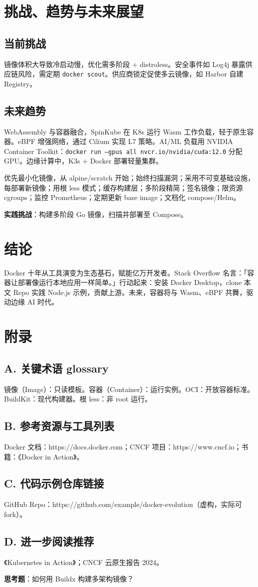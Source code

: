 \chapter{挑战、趋势与未来展望}
\section{当前挑战}
镜像体积大导致冷启动慢，优化需多阶段 + distroless。安全事件如 Log4j 暴露供应链风险，需定期 \texttt{docker scout}。供应商锁定促使多云镜像，如 Harbor 自建 Registry。\par
\section{未来趋势}
WebAssembly 与容器融合，SpinKube 在 K8s 运行 Wasm 工作负载，轻于原生容器。eBPF 增强网络，通过 Cilium 实现 L7 策略。AI/ML 负载用 NVIDIA Container Toolkit：\texttt{docker run --gpus all nvcr.io/nvidia/cuda:12.0} 分配 GPU。边缘计算中，K3s + Docker 部署轻量集群。\par
优先最小化镜像，从 alpine/scratch 开始；始终扫描漏洞；采用不可变基础设施，每部署新镜像；用根 less 模式；缓存构建层；多阶段精简；签名镜像；限资源 cgroups；监控 Prometheus；定期更新 base image；文档化 compose/Helm。\par
\textbf{实践挑战}：构建多阶段 Go 镜像，扫描并部署至 Compose。\par
\chapter{结论}
Docker 十年从工具演变为生态基石，赋能亿万开发者。Stack Overflow 名言：「容器让部署像运行本地应用一样简单。」行动起来：安装 Docker Desktop，clone 本文 Repo 实践 Node.js 示例，贡献上游。未来，容器将与 Wasm、eBPF 共舞，驱动边缘 AI 时代。\par
\chapter{附录}
\section{A. 关键术语 glossary}
镜像（Image）：只读模板。容器（Container）：运行实例。OCI：开放容器标准。BuildKit：现代构建器。根 less：非 root 运行。\par
\section{B. 参考资源与工具列表}
Docker 文档：https://docs.docker.com；CNCF 项目：https://www.cncf.io；书籍：《Docker in Action》。\par
\section{C. 代码示例仓库链接}
GitHub Repo：https://github.com/example/docker-evolution（虚构，实际可 fork）。\par
\section{D. 进一步阅读推荐}
《Kubernetes in Action》；CNCF 云原生报告 2024。\par
\textbf{思考题}：如何用 Buildx 构建多架构镜像？\par
